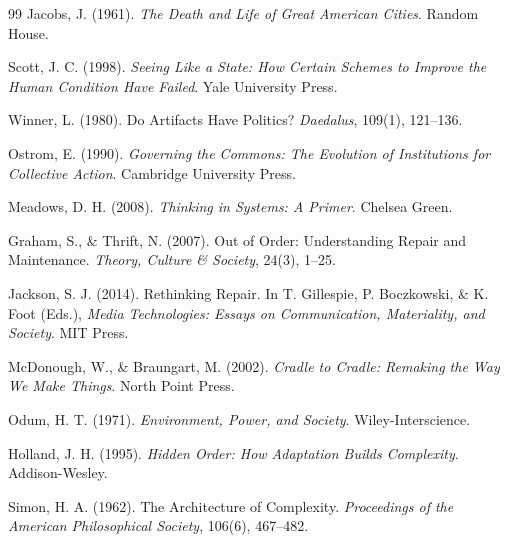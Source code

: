 \documentclass[12pt, a4paper]{article}
\theoremstyle{named}
\begin{document}
\begin{thebibliography}{99}
Jacobs, J. (1961).
\textit{The Death and Life of Great American Cities}.
Random House.

Scott, J. C. (1998).
\textit{Seeing Like a State: How Certain Schemes to Improve the Human
Condition Have Failed}.
Yale University Press.

Winner, L. (1980).
Do Artifacts Have Politics?
\textit{Daedalus}, 109(1), 121--136.

Ostrom, E. (1990).
\textit{Governing the Commons: The Evolution of Institutions for
Collective Action}.
Cambridge University Press.

Meadows, D. H. (2008).
\textit{Thinking in Systems: A Primer}.
Chelsea Green.

Graham, S., \& Thrift, N. (2007).
Out of Order: Understanding Repair and Maintenance.
\textit{Theory, Culture \& Society}, 24(3), 1--25.

Jackson, S. J. (2014).
Rethinking Repair.
In T. Gillespie, P. Boczkowski, \& K. Foot (Eds.),
\textit{Media Technologies: Essays on Communication, Materiality, and Society}.
MIT Press.

McDonough, W., \& Braungart, M. (2002).
\textit{Cradle to Cradle: Remaking the Way We Make Things}.
North Point Press.

Odum, H. T. (1971).
\textit{Environment, Power, and Society}.
Wiley-Interscience.

Holland, J. H. (1995).
\textit{Hidden Order: How Adaptation Builds Complexity}.
Addison-Wesley.

Simon, H. A. (1962).
The Architecture of Complexity.
\textit{Proceedings of the American Philosophical Society}, 106(6), 467--482.

\end{thebibliography}

\end{document}
